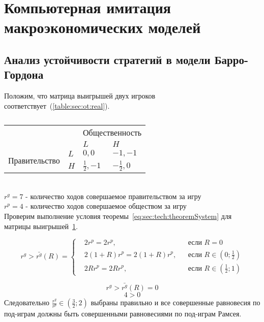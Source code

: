 \section{Компьютерная имитация макроэкономических моделей} 

\subsection{Анализ устойчивости стратегий в модели Барро-Гордона}
Положим, что матрица выигрышей двух игроков соответствует~(\ref{table:sec:ot:real}).\\
\begin{table}[h]
	\centering
	\begin{tabular}{|l|l|l|l|}
		\hline
		\multicolumn{2}{|l|}{\multirow{2}{*}{}} & \multicolumn{2}{l|}{Общественность} \\ \cline{3-4} 
		\multicolumn{2}{|l|}{}                  & $L$            & $H$            \\ \hline
		\multirow{2}{*}{Правительство}     & $L$     & $0,0$          & $-1,-1$          \\ \cline{2-4} 
		& $H$     & $\frac{1}{2},-1$          & $-\frac{1}{2},0$          \\ \hline
	\end{tabular}
	\caption{}	
	\label{table:sec:ot:real1}
\end{table}\\
$r^g= 7 $ - количество ходов совершаемое  правительством за игру\\
$r^p= 4 $ - количество ходов совершаемое  обществом за игру\\

Проверим выполнение условия теоремы~\ref{eq:sec:tech:theoremSystem} для матрицы выигрышей~\ref{table:sec:ot:real1}. 

$$
r^g> \bar{r^g}(R) = \left\{ 
\begin{aligned} 
&2r^p= 2r^p, &&\text{если } R=0
\\
&2(1+R)r^p= 2(1+R)r^p, &&\text{если } 	R\in\left(0; \frac{1}{2}\right)
\\
&2Rr^p= 2Rr^p, &&\text{если } 	R\in\left( \frac{1}{2};1\right)
\end{aligned}
\right.		
$$

$$
r^g> \bar{r^g}(R) = 0$$
$$
4 > 0
$$
Следовательно $\frac{r^g}{r^p} \in \left(\frac{3}{2};2\right)$ выбраны правильно и все совершенные равновесия по под-играм должны быть совершенными равновесиями по под-играм Рамсея. \\
 
